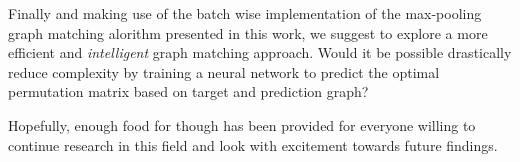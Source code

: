 Finally and making use of the batch wise implementation of the max-pooling graph matching alorithm presented in this work, we suggest to explore a more efficient and \textit{intelligent} graph matching approach. Would it be possible drastically reduce complexity by training a neural network to predict the optimal permutation matrix based on target and prediction graph?




Hopefully, enough food for though has been provided for everyone willing to continue research in this field and look with excitement towards future findings.

